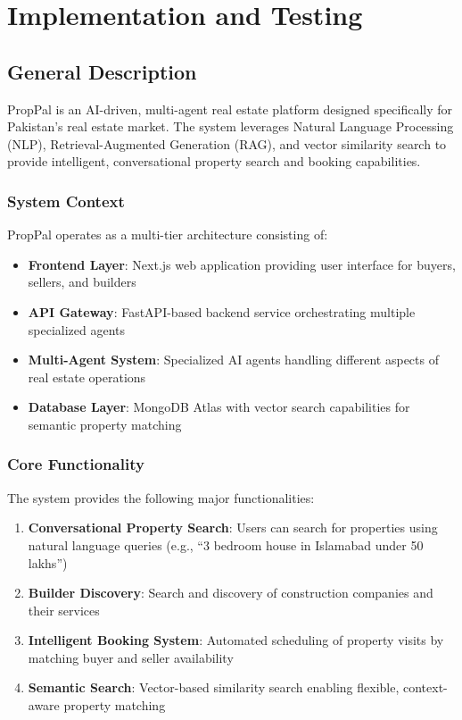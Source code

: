 \chapter{Implementation and Testing}

\section{General Description}

PropPal is an AI-driven, multi-agent real estate platform designed specifically for Pakistan's real estate market. The system leverages Natural Language Processing (NLP), Retrieval-Augmented Generation (RAG), and vector similarity search to provide intelligent, conversational property search and booking capabilities.

\subsection{System Context}

PropPal operates as a multi-tier architecture consisting of:

\begin{itemize}
    \item \textbf{Frontend Layer}: Next.js web application providing user interface for buyers, sellers, and builders
    \item \textbf{API Gateway}: FastAPI-based backend service orchestrating multiple specialized agents
    \item \textbf{Multi-Agent System}: Specialized AI agents handling different aspects of real estate operations
    \item \textbf{Database Layer}: MongoDB Atlas with vector search capabilities for semantic property matching
\end{itemize}

\subsection{Core Functionality}

The system provides the following major functionalities:

\begin{enumerate}
    \item \textbf{Conversational Property Search}: Users can search for properties using natural language queries (e.g., ``3 bedroom house in Islamabad under 50 lakhs'')
    \item \textbf{Builder Discovery}: Search and discovery of construction companies and their services
    \item \textbf{Intelligent Booking System}: Automated scheduling of property visits by matching buyer and seller availability
    \item \textbf{Semantic Search}: Vector-based similarity search enabling flexible, context-aware property matching
\end{enumerate}

